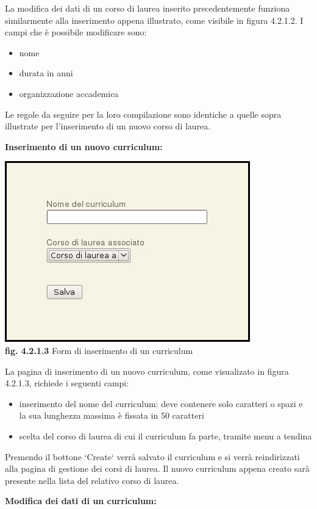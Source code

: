 \documentclass[11pt,a4paper]{article}
\begin{document}
La modifica dei dati di un corso di laurea inserito precedentemente funziona similarmente alla inserimento appena illustrato, come visibile in figura 4.2.1.2. I campi che è possibile modificare sono:
\begin{itemize}
 \item nome
 \item durata in anni
 \item organizzazione accademica
\end{itemize}
Le regole da seguire per la loro compilazione sono identiche a quelle sopra illustrate per l'inserimento di un nuovo corso di laurea.
\newline \newline
\begin{large}\textbf{Inserimento di un nuovo curriculum:}\end{large}

\begin{center}
	\includegraphics[scale=0.5]{images/nuovo_curriculum.jpg}\\
	\textbf{fig. 4.2.1.3} Form di inserimento di un curriculum\\
\end{center}

La pagina di inserimento di un nuovo curriculum, come visualizato in figura 4.2.1.3, richiede i seguenti campi:
\begin{itemize}
 \item inserimento del nome del curriculum: deve contenere solo caratteri o spazi e la sua lunghezza massima è fissata in 50 caratteri
 \item scelta del corso di laurea di cui il curriculum fa parte, tramite menu a tendina
\end{itemize}
Premendo il bottone `Create` verrà salvato il curriculum e si verrà reindirizzati alla pagina di gestione dei corsi di laurea. Il nuovo curriculum appena creato sarà presente nella lista del relativo corso di laurea.
\newline \newline
\begin{large}\textbf{Modifica dei dati di un curriculum:}\end{large}
\end{document}
